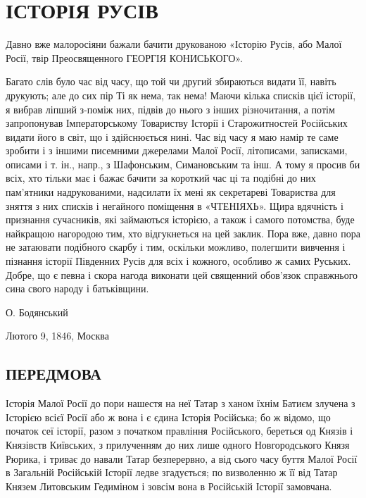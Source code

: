  
 
 
 
 

\chapter{ІСТОРІЯ РУСІВ}

\begin{zznagolos}
Давно вже малоросіяни бажали бачити друкованою «Історію Русів, або Малої Росії,
твір Преосвященного ГЕОРГІЯ КОНИСЬКОГО».

Багато слів було час від часу, що той чи другий збираються видати її, навіть
друкують; але до сих пір Ті як нема, так нема! Маючи кілька списків цієї
історії, я вибрав ліпший з-поміж них, підвів до нього з інших різночитання, а
потім запропонував Імператорському Товариству Історії і Старожитностей
Російських видати його в світ, що і здійснюється нині. Час від часу я маю намір
те саме зробити і з іншими писемними джерелами Малої Росії, літописами,
записками, описами і т. ін., напр., з Шафонським, Симановським та інш.  А тому
я просив би всіх, хто тільки має і бажає бачити за короткий час ці та подібні
до них пам'ятники надрукованими, надсилати їх мені як секретареві Товариства
для зняття з них списків і негайного поміщення в «ЧТЕНІЯХЬ». Щира вдячність і
признання сучасників, які займаються історією, а також і самого потомства, буде
найкращою нагородою тим, хто відгукнеться на цей заклик. Пора вже, давно пора
не затаювати подібного скарбу і тим, оскільки можливо, полегшити вивчення і
пізнання історії Південних Русів для всіх і кожного, особливо ж самих Руських.
Добре, що є певна і скора нагода виконати цей священний обов'язок справжнього
сина свого народу і батьківщини.

О. Бодянський

Лютого 9, 1846, Москва
\end{zznagolos}

\section{ПЕРЕДМОВА}

Історія Малої Росії до пори нашестя на неї Татар з ханом їхнім Батиєм злучена з
Історією всієї Росії або ж вона і є єдина Історія Російська; бо ж відомо, що
початок сеї історії, разом з початком правління Російського, береться од Князів
і Князівств Київських, з прилученням до них лише одного Новгородського Князя
Рюрика, і триває до навали Татар безперервно, а від сього часу буття Малої
Росії в Загальній Російській Історії ледве згадується; по визволенню ж її від
Татар Князем Литовським Гедиміном і зовсім вона в Російській Історії замовчана.

